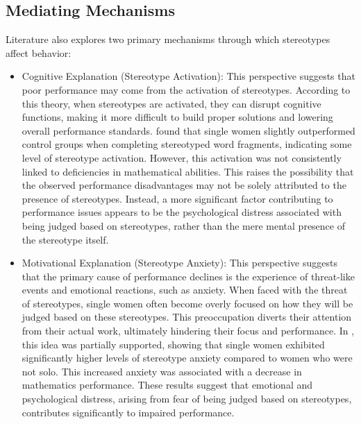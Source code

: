 \subsection{Mediating Mechanisms}
Literature also explores two primary mechanisms through which stereotypes affect behavior:
\begin{itemize}
    \item Cognitive Explanation (Stereotype Activation): This perspective suggests that poor performance may come from the activation of stereotypes. According to this theory, when stereotypes are activated, they can disrupt cognitive functions, making it more difficult to build proper solutions and lowering overall performance standards. \textcite{Beat} found that single women slightly outperformed control groups when completing stereotyped word fragments, indicating some level of stereotype activation. However, this activation was not consistently linked to deficiencies in mathematical abilities. This raises the possibility that the observed performance disadvantages may not be solely attributed to the presence of stereotypes. Instead, a more significant factor contributing to performance issues appears to be the psychological distress associated with being judged based on stereotypes, rather than the mere mental presence of the stereotype itself.
    \item Motivational Explanation (Stereotype Anxiety): This perspective suggests that the primary cause of performance declines is the experience of threat-like events and emotional reactions, such as anxiety. When faced with the threat of stereotypes, single women often become overly focused on how they will be judged based on these stereotypes. This preoccupation diverts their attention from their actual work, ultimately hindering their focus and performance. In \textcite{Beat}, this idea was partially supported, showing that single women exhibited significantly higher levels of stereotype anxiety compared to women who were not solo. This increased anxiety was associated with a decrease in mathematics performance. These results suggest that emotional and psychological distress, arising from fear of being judged based on stereotypes, contributes significantly to impaired performance.
\end{itemize}

